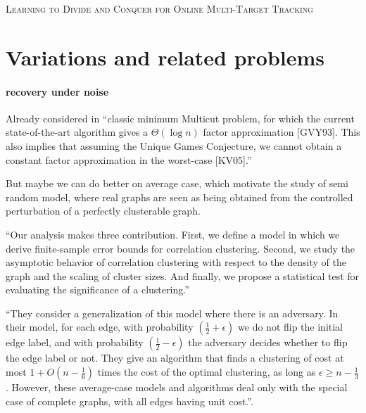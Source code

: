 \textsc{Learning to Divide and Conquer for Online Multi-Target Tracking}


\section{Variations and related problems}
\label{sec:related}

\paragraph{recovery under noise}
Already considered in \autocite[Section 6]{Bansal2002}
\enquote{classic minimum Multicut problem, for which the current
	state-of-the-art algorithm gives a $\Theta(\log n)$ factor approximation
	[GVY93]. This also implies that assuming the Unique Games Conjecture, we
	cannot obtain a constant factor approximation in the worst-case [KV05].}\autocite{Makarychev2014}

But maybe we can do better on average case, which motivate the study of semi
random model, where real graphs are seen as being obtained from the controlled
perturbation of a perfectly clusterable graph. 

\autocite{Joachims2005} \enquote{Our analysis makes three contribution. First, we
	define a model in which we derive finite-sample error bounds for
	correlation clustering. Second, we study the asymptotic behavior of
	correlation clustering with respect to the density of the graph and the
	scaling of cluster sizes. And finally, we propose a statistical test for
	evaluating the significance of a clustering.}

\autocite{Mathieu2010}

\enquote{They consider a generalization of this model where there is an adversary. In
their model, for each edge, with probability $(\frac{1}{2} + \epsilon)$ we do
not flip the initial edge label, and with probability $(\frac{1}{2} -
\epsilon)$ the adversary decides whether to flip the edge label or not. They
give an algorithm that finds a clustering of cost at most $1 + O(n -
\frac{1}{6})$ times the cost of the optimal clustering, as long as $\epsilon
\geq n - \frac{1}{3}$ .  However, these average-case models and algorithms deal
only with the special case of complete graphs, with all edges having unit
cost.}\autocite{Makarychev2014}.


